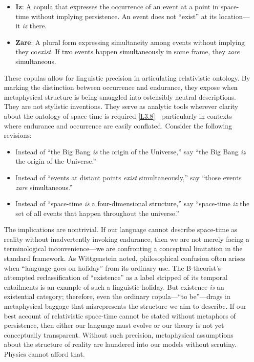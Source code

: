 \documentclass[12pt]{book}
\newcounter{logicanchor}
\newenvironment{logicanchorenv}[1]{\refstepcounter{logicanchor}\label{#1}}{}
\newcommand{\logiclink}[2]{\begin{logicanchorenv}{logic:#1}\end{logicanchorenv}\hyperref[appendix:#1]{[#1]}\xspace}
\begin{document}
\begin{itemize}
    \item \textbf{Iz}: A copula that expresses the occurrence of an event at a point in space-time without implying persistence. An event does not ``exist'' at its location---it \textit{iz} there.
    \item \textbf{Zare}: A plural form expressing simultaneity among events without implying they co\textit{exist}. If two events happen simultaneously in some frame, they \textit{zare} simultaneous.
\end{itemize}

These copulas allow for linguistic precision in articulating relativistic ontology. By marking the distinction between occurrence and endurance, they expose when metaphysical structure is being smuggled into ostensibly neutral descriptions. They are not stylistic inventions. They serve as analytic tools wherever clarity about the ontology of space-time is required \logiclink{L3.8}{}---particularly in contexts where endurance and occurrence are easily conflated. Consider the following revisions:

\begin{itemize}
    \item Instead of ``the Big Bang \textit{is} the origin of the Universe,'' say ``the Big Bang \textit{iz} the origin of the Universe.''
    \item Instead of ``events at distant points \textit{exist} simultaneously,'' say ``those events \textit{zare} simultaneous.''
    \item Instead of ``space-time \textit{is} a four-dimensional structure,'' say ``space-time \textit{iz} the set of all events that happen throughout the universe.''
\end{itemize}

The implications are nontrivial. If our language cannot describe space-time as reality without inadvertently invoking endurance, then we are not merely facing a terminological inconvenience---we are confronting a conceptual limitation in the standard framework. As Wittgenstein noted, philosophical confusion often arises when ``language goes on holiday'' from its ordinary use. The B-theorist's attempted reclassification of ``existence'' as a label stripped of its temporal entailments is an example of such a linguistic holiday. But existence \textit{is} an existential category; therefore, even the ordinary copula---``to be''---drags in metaphysical baggage that misrepresents the structure we aim to describe. If our best account of relativistic space-time cannot be stated without metaphors of persistence, then either our language must evolve or our theory is not yet conceptually transparent. Without such precision, metaphysical assumptions about the structure of reality are laundered into our models without scrutiny. Physics cannot afford that.
\end{document}
